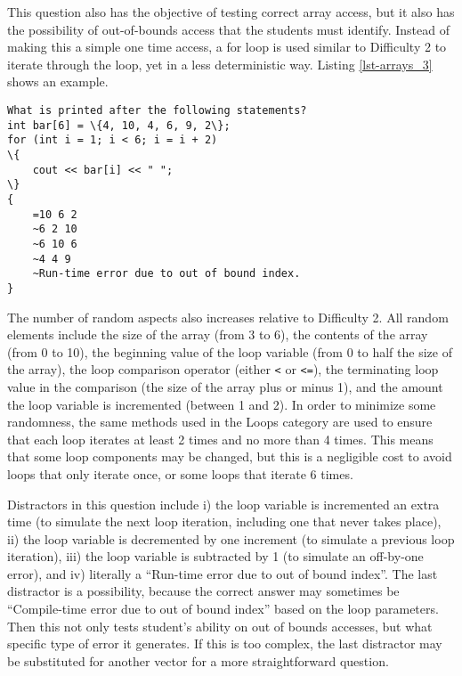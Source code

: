 \documentclass{article}
\begin{document}
This question also has the objective of testing correct array access, but it also has the possibility of out-of-bounds access that the students must identify. Instead of making this a simple one time
access, a for loop is used similar to Difficulty 2 to iterate through the loop, yet in a less deterministic way. Listing \ref{lst-arrays_3} shows an example.

\begin{lstlisting}[caption={\textbf{Arrays} Difficulty 3 GIFT Example}, label=lst-arrays_3, float]
What is printed after the following statements?
int bar[6] = \{4, 10, 4, 6, 9, 2\};
for (int i = 1; i < 6; i = i + 2)
\{
	cout << bar[i] << " ";
\}
{
	=10 6 2 
	~6 2 10 
	~6 10 6 
	~4 4 9 
	~Run-time error due to out of bound index.
}
\end{lstlisting}


The number of random aspects also increases relative to Difficulty 2. All random elements include the size of the array (from 3 to 6), the contents of the array (from 0 to 10), the beginning value
of the loop variable (from 0 to half the size of the array), the loop comparison operator (either \verb;<; or \verb;<=;), the terminating loop value in the comparison (the size of the array 
plus or minus 1), and the amount the loop variable is incremented (between 1 and 2). In order to minimize some randomness, the same methods used in the Loops category are used to ensure
that each loop iterates at least 2 times and no more than 4 times. This means that some loop components may be changed, but this is a negligible cost to avoid loops that only iterate once, or 
some loops that iterate 6 times.

Distractors in this question include i) the loop variable is incremented an extra time (to simulate the next loop iteration, including one that never takes place), ii) the loop variable is decremented by one increment (to simulate a previous loop iteration), iii) the loop variable is subtracted by 1 (to simulate an off-by-one error), and iv) literally a ``Run-time error due to out of bound index''.
The last distractor is a possibility, because the correct answer may sometimes be ``Compile-time error due to out of bound index'' based on the loop parameters. Then this not only tests 
student's ability on out of bounds accesses, but what specific type of error it generates. If this is too complex, the last distractor may be substituted for another vector for a more straightforward
question.
\end{document}
